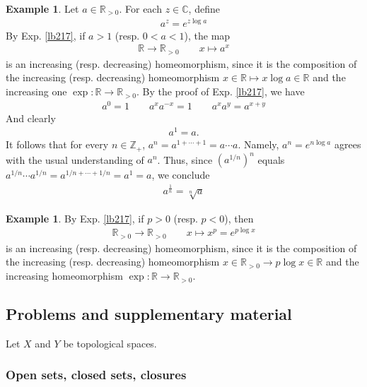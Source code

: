 \documentclass[12pt,b5paper,notitlepage]{article}
\theoremstyle{definition}
\newtheorem{eg}[df]{Example}
\theoremstyle{plain}
\newcommand{\Cbb}{\mathbb C}
\newcommand{\Zbb}{\mathbb Z}
\newcommand{\Rbb}{\mathbb R}
\numberwithin{equation}{section}
\begin{document}
\begin{eg}
Let $a\in\Rbb_{>0}$. For each $z\in\Cbb$, define
\begin{align}
a^z=e^{z\log a}
\end{align}
By Exp. \ref{lb217}, if $a>1$ (resp. $0<a<1$), the map
\begin{align}
\Rbb\rightarrow\Rbb_{>0}\qquad x\mapsto a^x
\end{align}
is an increasing (resp. decreasing) homeomorphism, since it is the composition of the increasing (resp. decreasing) homeomorphism $x\in\Rbb\mapsto x\log a\in\Rbb$ and the increasing one $\exp:\Rbb\rightarrow\Rbb_{>0}$. By the proof of Exp. \ref{lb217}, we have 
\begin{align}
a^0=1\qquad a^xa^{-x}=1\qquad a^xa^y=a^{x+y}
\end{align}
And clearly
\begin{align}
a^1=a.
\end{align}
It follows that for every $n\in\Zbb_+$, $a^n=a^{1+\cdots+1}=a\cdots a$. Namely, $a^n=e^{n\log a}$ agrees with the usual understanding of $a^n$. Thus, since $(a^{1/n})^n$ equals $a^{1/n}\cdots a^{1/n}=a^{1/n+\cdots+1/n}=a^1=a$, we conclude
\begin{align*}
a^{\frac 1n}=\sqrt[n]{a}
\end{align*}
\end{eg}



\begin{eg}
By Exp. \ref{lb217}, if $p>0$ (resp. $p<0$), then
\begin{align}
\Rbb_{>0}\rightarrow\Rbb_{> 0} \qquad x\mapsto x^p=e^{p\log x}\label{eq102}
\end{align}
is an increasing (resp. decreasing) homeomorphism, since it is the composition of the increasing (resp. decreasing)  homeomorphism $x\in\Rbb_{>0}\rightarrow p\log x\in\Rbb$ and the increasing homeomorphism $\exp:\Rbb\rightarrow\Rbb_{>0}$. 
\end{eg}







\subsection{Problems and supplementary material}


Let $X$ and $Y$ be topological spaces.

\subsubsection{Open sets, closed sets, closures}
\end{document}
